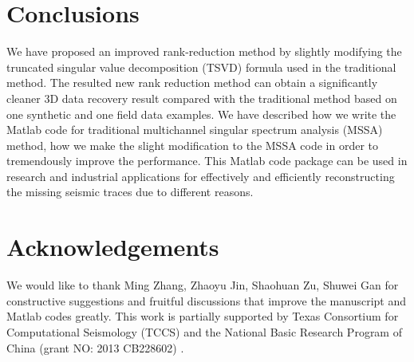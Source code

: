

\section{Conclusions}
We have proposed an improved rank-reduction method by slightly modifying the truncated singular value decomposition (TSVD) formula used in the traditional method. The resulted new rank reduction method can obtain a significantly cleaner 3D data recovery result compared with the traditional method based on one synthetic and one field data examples. We have described how we write the Matlab code for traditional multichannel singular spectrum analysis (MSSA) method, how we make the slight modification to the MSSA code in order to tremendously improve the performance. This Matlab code package can be used in research and industrial applications for effectively and efficiently reconstructing the missing seismic traces due to different reasons. 

\section{Acknowledgements}
We would like to thank Ming Zhang, Zhaoyu Jin, Shaohuan Zu, Shuwei Gan for constructive suggestions and fruitful discussions that improve the manuscript and Matlab codes greatly. This work is partially supported by Texas Consortium for Computational Seismology (TCCS) and the National Basic Research Program of China (grant NO: 2013 CB228602) . 




